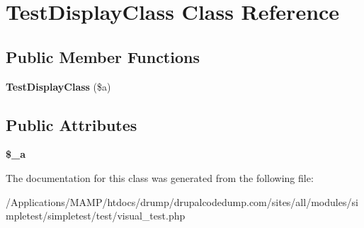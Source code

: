 \hypertarget{class_test_display_class}{
\section{TestDisplayClass Class Reference}
\label{class_test_display_class}
}
\subsection*{Public Member Functions}
\begin{DoxyCompactItemize}
\item 
\hypertarget{class_test_display_class_a38e285e45c4252a112e33b1137daeb04}{
{\bfseries TestDisplayClass} (\$a)}
\label{class_test_display_class_a38e285e45c4252a112e33b1137daeb04}

\end{DoxyCompactItemize}
\subsection*{Public Attributes}
\begin{DoxyCompactItemize}
\item 
\hypertarget{class_test_display_class_a9bc5b4a63431ee30ba66246eec1cd732}{
{\bfseries \$\_\-a}}
\label{class_test_display_class_a9bc5b4a63431ee30ba66246eec1cd732}

\end{DoxyCompactItemize}


The documentation for this class was generated from the following file:\begin{DoxyCompactItemize}
\item 
/Applications/MAMP/htdocs/drump/drupalcodedump.com/sites/all/modules/simpletest/simpletest/test/visual\_\-test.php\end{DoxyCompactItemize}
